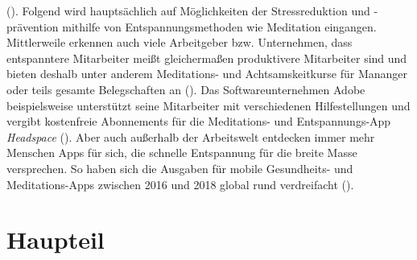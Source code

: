 \documentclass[10pt]{article}
\newcommand{\zit}[1]{(\cite{#1})}
\begin{document}
\zit{Stressbewältigung}.
Folgend wird hauptsächlich auf Möglichkeiten der Stressreduktion und -prävention mithilfe von Entspannungsmethoden wie Meditation eingangen. 
Mittlerweile erkennen auch viele Arbeitgeber bzw. Unternehmen, dass entspanntere Mitarbeiter meißt gleichermaßen produktivere Mitarbeiter sind und bieten deshalb unter anderem Meditations- und Achtsamskeitkurse für Mananger oder teils gesamte Belegschaften an \zit{Handelsblatt}. Das Softwareunternehmen Adobe beispielsweise unterstützt seine Mitarbeiter mit verschiedenen Hilfestellungen und vergibt kostenfreie Abonnements für die Meditations- und Entspannungs-App \textit{Headspace} \zit{Adobe}. 
Aber auch außerhalb der Arbeitswelt entdecken immer mehr Menschen Apps für sich, die schnelle Entspannung für die breite Masse versprechen. So haben sich die Ausgaben für mobile Gesundheits- und Meditations-Apps zwischen 2016 und 2018 global rund verdreifacht \zit{SteigendeNutzung}.





    

\bigbreak


\section{Haupteil}


\nocite{*}
\printbibliography
\end{document}
